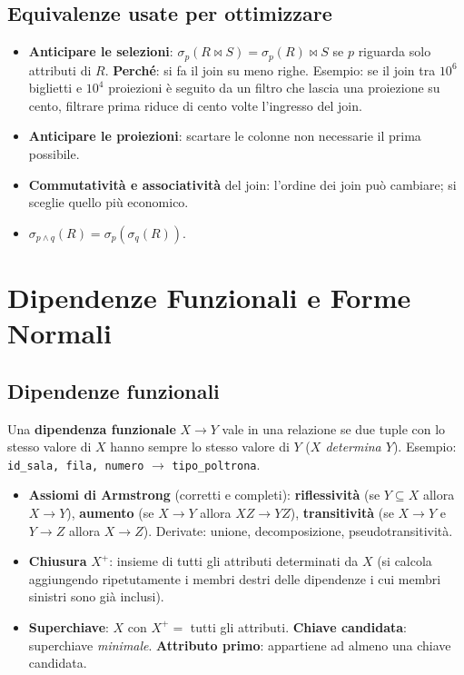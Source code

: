 \subsection{Equivalenze usate per ottimizzare}
\begin{itemize}
    \item \textbf{Anticipare le selezioni}: $\sigma_p(R\bowtie S) = \sigma_p(R)\bowtie S$ se $p$ riguarda solo attributi di $R$. \textbf{Perché}: si fa il join su meno righe. Esempio: se il join tra $10^6$ biglietti e $10^4$ proiezioni è seguito da un filtro che lascia una proiezione su cento, filtrare prima riduce di cento volte l'ingresso del join.
    \item \textbf{Anticipare le proiezioni}: scartare le colonne non necessarie il prima possibile.
    \item \textbf{Commutatività e associatività} del join: l'ordine dei join può cambiare; si sceglie quello più economico.
    \item $\sigma_{p\wedge q}(R) = \sigma_p(\sigma_q(R))$.
\end{itemize}

\section{Dipendenze Funzionali e Forme Normali}

\subsection{Dipendenze funzionali}
Una \textbf{dipendenza funzionale} $X\to Y$ vale in una relazione se due tuple con lo stesso valore di $X$ hanno sempre lo stesso valore di $Y$ (\emph{$X$ determina $Y$}). Esempio: \texttt{id\_sala, fila, numero} $\to$ \texttt{tipo\_poltrona}.
\begin{itemize}
    \item \textbf{Assiomi di Armstrong} (corretti e completi): \textbf{riflessività} (se $Y\subseteq X$ allora $X\to Y$), \textbf{aumento} (se $X\to Y$ allora $XZ\to YZ$), \textbf{transitività} (se $X\to Y$ e $Y\to Z$ allora $X\to Z$). Derivate: unione, decomposizione, pseudotransitività.
    \item \textbf{Chiusura} $X^+$: insieme di tutti gli attributi determinati da $X$ (si calcola aggiungendo ripetutamente i membri destri delle dipendenze i cui membri sinistri sono già inclusi).
    \item \textbf{Superchiave}: $X$ con $X^+ = $ tutti gli attributi. \textbf{Chiave candidata}: superchiave \emph{minimale}. \textbf{Attributo primo}: appartiene ad almeno una chiave candidata.
\end{itemize}

